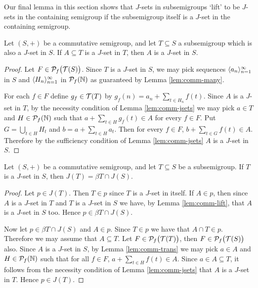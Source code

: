 Our final lemma in this section shows that $J$-sets in subsemigroups `lift' to be $J$-sets in the containing semigroup if the subsemigroup itself is a $J$-set in the containing semigroup.

\begin{lem}
  \label{lem:comm-lift}
  Let $(S, +)$ be a commutative semigroup, and let $T \subseteq S$ a subsemigroup which is also a $J$-set in $S$.
  If $A \subseteq T$ is a $J$-set in $T$, then $A$ is a $J$-set in $S$. 
\end{lem}
\begin{proof}
  Let $F \in \mathcal{P}_f\bigl( \mathcal{T}(S) \bigr)$. 
  Since $T$ is a $J$-set in $S$, we may pick sequences $\langle a_n \rangle_{n=1}^\infty$ in $S$ and $\langle H_n \rangle_{n=1}^\infty$ in $\mathcal{P}_f(\mathbb{N})$ as guaranteed by Lemma \ref{lem:comm-many}.

  For each $f \in F$ define $g_f \in \mathcal{T}(T)$ by $g_f(n) = a_n + \sum_{t \in H_n} f(t)$. 
  Since $A$ is a $J$-set in $T$, by the necessity condition of Lemma \ref{lem:comm-jsets} we may pick $a \in T$ and $H \in \mathcal{P}_f(\mathbb{N})$ such that $a + \sum_{t \in H} g_f(t) \in A$ for every $f \in F$. 
  Put $G = \bigcup_{t \in H} H_t$ and $b = a + \sum_{t \in H} a_t$. 
  Then for every $f \in F$, $b + \sum_{t \in G} f(t) \in A$. 
  Therefore by the sufficiency condition of Lemma \ref{lem:comm-jsets} $A$ is a $J$-set in $S$.
\end{proof}

\begin{thm}
  Let $(S,+)$ be a commutative semigroup, and let $T \subseteq S$ be a subsemigroup.
  If $T$ is a $J$-set in $S$, then $J(T) = \beta T \cap J(S)$.
\end{thm}
\begin{proof}
  Let $p \in J(T)$. 
  Then $T \in p$ since $T$ is a $J$-set in itself.
  If $A \in p$, then since $A$ is a $J$-set in $T$ and $T$ is a $J$-set in $S$ we have, by Lemma \ref{lem:comm-lift}, that $A$ is a $J$-set in $S$ too.
  Hence $p \in \beta T \cap J(S)$. 

  Now let $p \in \beta T \cap J(S)$ and $A \in p$. 
  Since $T \in p$ we have that $A \cap T \in p$.
  Therefore we may assume that $A \subseteq T$. 
  Let $F \in \mathcal{P}_f\bigl( \mathcal{T}(T) \bigr)$, then $F \in \mathcal{P}_f\bigl( \mathcal{T}(S) \bigr)$ also.
  Since $A$ is a $J$-set in $S$, by Lemma \ref{lem:comm-trans} we may pick $a \in A$ and $H \in \mathcal{P}_f(\mathbb{N})$ such that for all $f \in F$, $a + \sum_{t \in H} f(t) \in A$.
  Since $a \in A \subseteq T$, it follows from the necessity condition of Lemma \ref{lem:comm-jsets} that $A$ is a $J$-set in $T$.
  Hence $p \in J(T)$.
\end{proof}

